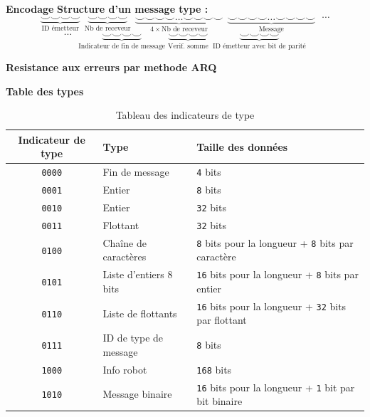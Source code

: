 \documentclass[aspectratio=169,10pt]{beamer}
\begin{document}
\begin{frame}{\textbf{Encodage}}
	\textbf{Structure d'un message type :}
	$$
	\underbrace{\smallsmile \smallsmile \smallsmile \smallsmile}_{\text{ID émetteur}}~~
	\underbrace{\smallsmile \smallsmile \smallsmile \smallsmile}_{\text{Nb de receveur}}~~
	\underbrace{\smallsmile \smallsmile \smallsmile \smallsmile \dots \smallsmile \smallsmile \smallsmile \smallsmile}_{4 \times \text{Nb de receveur}}~~
	\underbrace{\smallsmile \smallsmile \smallsmile \smallsmile \dots \smallsmile \smallsmile \smallsmile \smallsmile}_{\text{Message}}
	~~~ \cdots
	$$
	\vspace{0.3em}
	$$
	\cdots ~~~
	\underbrace{\smallsmile \smallsmile \smallsmile \smallsmile}_{\text{Indicateur de fin de message}}\;
	\underbrace{\smallsmile \smallsmile \smallsmile \smallsmile}_{\text{Verif. somme}}~~
	\underbrace{\smallsmile \smallsmile \smallsmile \smallsmile}_{\text{ID émetteur avec bit de parité}}
	$$

	\textbf{Resistance aux erreurs par methode ARQ}
\end{frame}


\begin{frame}{\textbf{Table des types}}
    \begin{table}[H]
		\centering
		\begin{tabular}{c l l}
			\hline
			\textbf{Indicateur de type} & \textbf{Type} & \textbf{Taille des données}\\
			\hline
			\texttt{0000} & Fin de message & \texttt{4} bits\\
			\texttt{0001} & Entier & \texttt{8} bits\\
			\texttt{0010} & Entier & \texttt{32} bits\\
			\texttt{0011} & Flottant & \texttt{32} bits\\
			\texttt{0100} & Chaîne de caractères & \texttt{8} bits pour la longueur + \texttt{8} bits par caractère\\
			\texttt{0101} & Liste d'entiers 8 bits & \texttt{16} bits pour la longueur + \texttt{8} bits par entier\\
			\texttt{0110} & Liste de flottants & \texttt{16} bits pour la longueur + \texttt{32} bits par flottant\\
			\texttt{0111} & ID de type de message & \texttt{8} bits\\
			\texttt{1000} & Info robot & \texttt{168} bits\\
			\texttt{1010} & Message binaire & \texttt{16} bits pour la longueur + \texttt{1} bit par bit binaire\\
			\hline
		\end{tabular}
		\caption{Tableau des indicateurs de type}
	\end{table}
\end{frame}
\end{document}
